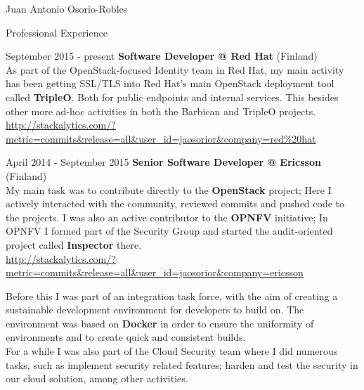 \documentclass[english,10pt,letterpaper]{article}
\begin{document}
\begin{cv}{Juan Antonio Osorio-Robles}
	\begin{cvlist}{Professional Experience}
		\item [September 2015 - present]
            \textbf{Software Developer @ Red Hat} (Finland)\\
            As part of the OpenStack-focused Identity team in Red Hat, my main
            activity has been getting SSL/TLS into Red Hat's main OpenStack
            deployment tool called \textbf{TripleO}. Both for public endpoints
            and internal services. This besides other more ad-hoc activities
            in both the Barbican and TripleO projects.\\

            \href{http://stackalytics.com/?metric=commits&release=all&user_id=jaosorior&company=red\%20hat}
            {\url{http://stackalytics.com/?metric=commits&release=all&user_id=jaosorior&company=red\%20hat}}

		\item [April 2014 - September 2015]
            \textbf{Senior Software Developer @ Ericsson} (Finland)\\
            My main task was to contribute directly to the
            \textbf{OpenStack} project; Here I actively interacted with the
            community, reviewed commits and pushed code to the projects.
            I was also an active contributor to the \textbf{OPNFV}
            initiative; In OPNFV I formed part of the Security Group and
            started the audit-oriented project called \textbf{Inspector}
            there.\\

            \href{http://stackalytics.com/?metric=commits&release=all&user_id=jaosorior&company=ericsson}
            {\url{http://stackalytics.com/?metric=commits&release=all&user_id=jaosorior&company=ericsson}}

            Before this I was part of an integration task force, with the
            aim of creating a sustainable development environment for
            developers to build on. The environment was based on
            \textbf{Docker} in order to ensure the uniformity of
            environments and to create quick and consistent builds.\\

            For a while I was also part of the Cloud Security team where
            I did numerous tasks, such as implement security related
            features; harden and test the security in our cloud solution,
            among other activities.


\end{cvlist}
\end{cv}
\end{document}
